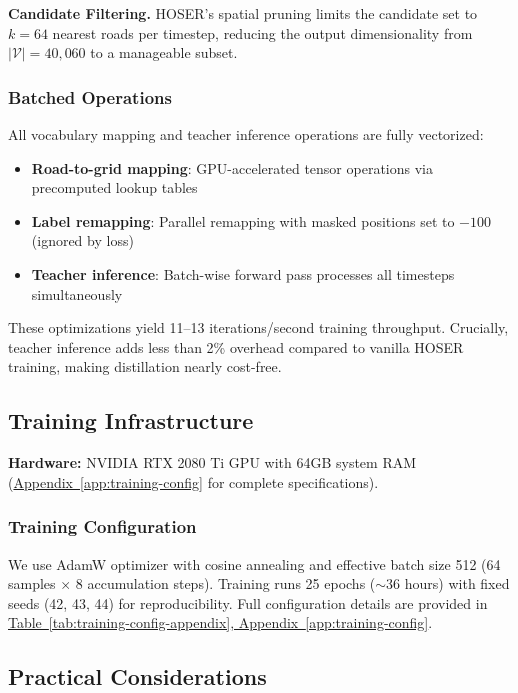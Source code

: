\textbf{Candidate Filtering.} HOSER's spatial pruning limits the candidate set to $k = 64$ nearest roads per timestep, reducing the output dimensionality from $|\mathcal{V}| = 40{,}060$ to a manageable subset.

\subsubsection{Batched Operations}

All vocabulary mapping and teacher inference operations are fully vectorized:

\begin{itemize}[noitemsep,topsep=0pt]
    \item \textbf{Road-to-grid mapping}: GPU-accelerated tensor operations via precomputed lookup tables
    \item \textbf{Label remapping}: Parallel remapping with masked positions set to $-100$ (ignored by loss)
    \item \textbf{Teacher inference}: Batch-wise forward pass processes all timesteps simultaneously
\end{itemize}

These optimizations yield 11--13 iterations/second training throughput. Crucially, teacher inference adds less than 2\% overhead compared to vanilla HOSER training, making distillation nearly cost-free.

\subsection{Training Infrastructure}
\label{sec:impl-infra}

\textbf{Hardware:} NVIDIA RTX 2080 Ti GPU with 64GB system RAM (\hyperref[app:training-config]{Appendix~\ref*{app:training-config}} for complete specifications).

\subsubsection{Training Configuration}

We use AdamW optimizer with cosine annealing and effective batch size 512 (64 samples $\times$ 8 accumulation steps). Training runs 25 epochs ($\sim$36 hours) with fixed seeds (42, 43, 44) for reproducibility. Full configuration details are provided in \hyperref[app:training-config]{Table~\ref*{tab:training-config-appendix}, Appendix~\ref*{app:training-config}}.

\subsection{Practical Considerations}
\label{sec:impl-practical}

